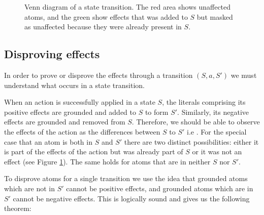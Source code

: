 \documentclass[../Master.tex]{subfiles}
\begin{document}
\begin{figure}
	\def\firstcircle{(0,0) circle (1.5cm)}
	\def\secondcircle{(0:2cm) circle (1.5cm)}
	\def\thirdcircle{(0:3.8cm) circle (2.9cm)}
	\centering
    \caption{\label{fig:nca:venn-of-effects} Venn diagram of a state transition. The red area shows unaffected atoms, and the green show effects that was added to $S$ but masked as unaffected because they were already present in $S$.}
\end{figure}


\subsection{Disproving effects}
In order to prove or disprove the effects through a transition $(S,a,S')$ we must understand what occurs in a state transition.

When an action is successfully applied in a state $S$, the literals comprising its positive effects are grounded and added to $S$ to form $S'$. Similarly, its negative effects are grounded and removed from $S$. Therefore, we should be able to observe the effects of the action as the differences between $S$ to $S'$ i.e \geffects. For the special case that an atom is both in $S$ and $S'$ there are two distinct possibilities: either it is part of the effects of the action but was already part of $S$ or it was not an effect (see Figure \ref{fig:nca:venn-of-effects}). The same holds for atoms that are in neither $S$ nor $S'$.

To disprove atoms for a single transition we use the idea that grounded atoms which are not in $S'$ cannot be positive effects, and grounded atoms which are in $S'$ cannot be negative effects. 
This is logically sound and gives us the following theorem:
\end{document}
